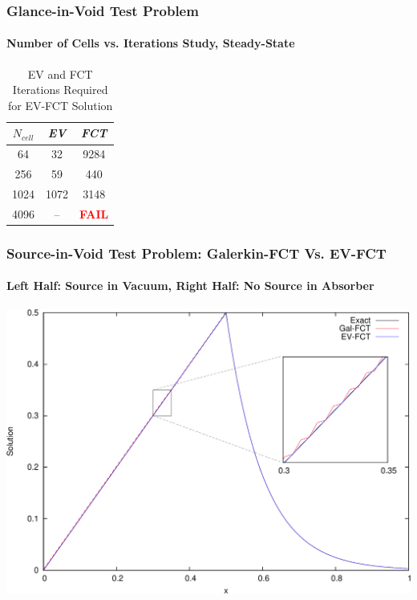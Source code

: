 \begin{frame}
\frametitle{Glance-in-Void Test Problem}
\framesubtitle{Number of Cells vs. Iterations Study, Steady-State}

\begin{center}
\begin{table}[h]
\caption{EV and FCT Iterations Required for EV-FCT Solution}
\begin{tabular}{c c c}\toprule
$N_{cell}$ & \emph{EV} & \emph{FCT}\\\midrule
  64 &   32 & 9284\\
 256 &   59 &  440\\
1024 & 1072 & 3148\\
4096 &   -- & \textcolor{red}{\textbf{FAIL}}\\
\bottomrule\end{tabular}
\end{table}
\end{center}

\end{frame}
\begin{frame}
\frametitle{Source-in-Void Test Problem: Galerkin-FCT Vs. EV-FCT}
\framesubtitle{Left Half: Source in Vacuum, Right Half: No Source in Absorber}

\begin{center}
\includegraphics[height=0.8\textheight]{./figures/sourcevoid_FCT_comparison.pdf}
\end{center}

\end{frame}
